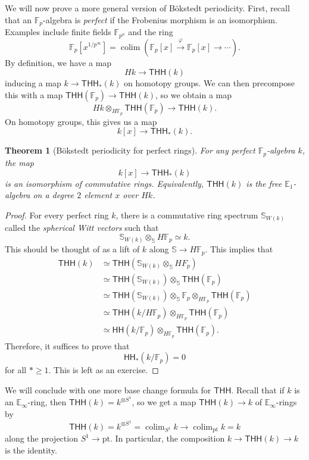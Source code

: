 \documentclass[10pt, oneside]{memoir}
\newtheorem{thm}{Theorem}[subsection]
\theoremstyle{definition}
\theoremstyle{remark}
\theoremstyle{plain}
\theoremstyle{definition}
\theoremstyle{remark}
\newcommand{\E}{\mathbb{E}}
\newcommand{\F}{\mathbb{F}}
\newcommand{\bS}{\mathbb{S}}
\newcommand{\mr}[1]{\mathrm{#1}}
\newcommand{\ms}[1]{\mathsf{#1}}
\newcommand{\1}{\mathbf{1}}
\newcommand{\2}{\mathbf{2}}
\newcommand{\3}{\mathbf{3}}
\newcommand{\pt}{\mr{pt}}
\newcommand{\THH}{\ms{THH}}
\newcommand{\HH}{\ms{HH}}
\DeclareMathOperator*{\colim}{colim}
\begin{document}
We will now prove a more general version of B\"okstedt periodicity. First, recall that an $\F_p$-algebra is \textit{perfect} if the Frobenius morphism is an isomorphism. Examples include finite fields $\F_{p^n}$ and the ring
\[ \F_p[x^{1/p^{\infty}}] = \colim (\F_p[x] \xrightarrow{\varphi} \F_p[x] \to \cdots). \]
By definition, we have a map
\[ Hk \to \THH(k) \]
inducing a map $k \to \THH_*(k)$ on homotopy groups. We can then precompose this with a map $\THH(\F_p) \to \THH(k)$, so we obtain a map
\[ Hk \otimes_{H \F_p} \THH(\F_p) \to \THH(k). \]
On homotopy groups, this gives us a map
\[ k[x] \to \THH_*(k). \]

\begin{thm}[B\"okstedt periodicity for perfect rings]
    For any perfect $\F_p$-algebra $k$, the map
    \[ k[x] \to \THH_*(k) \]
    is an isomorphism of commutative rings. Equivalently, $\THH(k)$ is the free $\E_1$-algebra on a degree $2$ element $x$ over $Hk$.
\end{thm}

\begin{proof}
    For every perfect ring $k$, there is a commutative ring spectrum $\bS_{W(k)}$ called the \textit{spherical Witt vectors} such that
    \[ \bS_{W(k)} \otimes_{\bS} H \F_p \simeq k. \]
    This should be thought of as a lift of $k$ along $\bS \to H \F_p$. This implies that
    \begin{align*}
        \THH(k) &\simeq \THH(\bS_{W(k)}\otimes_{\bS} H F_p) \\
        &\simeq \THH(\bS_{W(k)}) \otimes_{\bS} \THH(\F_p) \\
        &\simeq \THH(\bS_{W(k)}) \otimes_{\bS} \F_p \otimes_{H\F_p} \THH(\F_p) \\
        &\simeq \THH(k/H\F_p) \otimes_{H \F_p} \THH(\F_p) \\
        &\simeq \HH(k/\F_p) \otimes_{H \F_p} \THH(\F_p).
    \end{align*}
    Therefore, it suffices to prove that
    \[ \HH_*(k/\F_p) = 0 \]
    for all $* \geq 1$. This is left as an exercise.
\end{proof}

We will conclude with one more base change formula for $\THH$. Recall that if $k$ is an $\E_{\infty}$-ring, then $\THH(k) = k^{\otimes S^1}$, so we get a map $\THH(k) \to k$ of $\E_{\infty}$-rings by
\[ \THH(k) = k^{\otimes S^1} = \colim_{S^1} k \to \colim_{\pt} k = k \]
along the projection $S^1 \to \pt$. In particular, the composition $k \to \THH(k) \to k$ is the identity.
\end{document}
